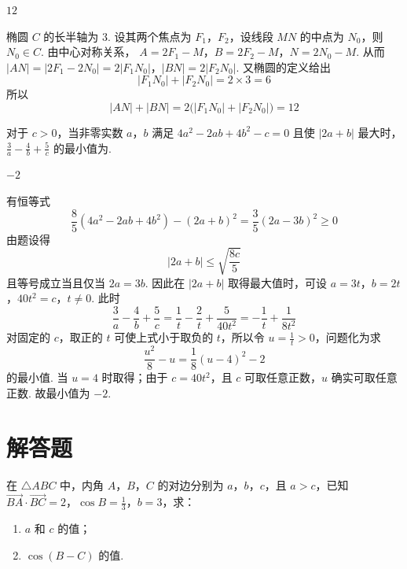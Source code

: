 \begin{answer}
\(12\)
\end{answer}

\begin{solution}
椭圆 \(C\) 的长半轴为 \(3\). 设其两个焦点为 \(F_1\)，\(F_2\)，设线段 \(MN\) 的中点为 \(N_0\)，则 \(N_0\in C\). 由中心对称关系，
\(A=2F_1-M\)，\(B=2F_2-M\)，\(N=2N_0-M\).
从而
\(|AN|=|2F_1-2N_0|=2|F_1N_0|\)，\(|BN|=2|F_2N_0|\).
又椭圆的定义给出
\[
|F_1N_0|+|F_2N_0|=2\times3=6
\]
所以
\[
|AN|+|BN|=2\bigl(|F_1N_0|+|F_2N_0|\bigr)=12
\]
\end{solution}

\begin{problem}
对于 \(c > 0\)，当非零实数 \(a\)，\(b\) 满足 \(4a^2 - 2ab + 4b^2 - c = 0\) 且使 \(|2a + b|\) 最大时，\(\frac{3}{a} - \frac{4}{b} + \frac{5}{c}\) 的最小值为\fillinblank{}.
\end{problem}

\begin{answer}
\(-2\)
\end{answer}

\begin{solution}
有恒等式
\[
\frac85\left(4a^2-2ab+4b^2\right)-(2a+b)^2=\frac35(2a-3b)^2\geqslant0
\]
由题设得
\[
|2a+b|\leqslant\sqrt{\frac{8c}{5}}
\]
且等号成立当且仅当 \(2a=3b\). 因此在 \(|2a+b|\) 取得最大值时，可设
\(a=3t\)，\(b=2t\)，\(40t^2=c\)，\(t\neq0\).
此时
\[
\frac3a-\frac4b+\frac5c=\frac1t-\frac2t+\frac5{40t^2}=-\frac1t+\frac1{8t^2}
\]
对固定的 \(c\)，取正的 \(t\) 可使上式小于取负的 \(t\)，所以令 \(u=\frac1t>0\)，问题化为求
\[
\frac{u^2}{8}-u=\frac18(u-4)^2-2
\]
的最小值. 当 \(u=4\) 时取得；由于 \(c=40t^2\)，且 \(c\) 可取任意正数，\(u\) 确实可取任意正数. 故最小值为 \(-2\).
\end{solution}

\section{解答题}

\begin{problem}
在 \(\triangle ABC\) 中，内角 \(A\)，\(B\)，\(C\) 的对边分别为 \(a\)，\(b\)，\(c\)，且 \(a > c\)，已知 \(\overrightarrow{BA} \cdot \overrightarrow{BC} = 2\)，\(\cos B = \frac{1}{3}\)，\(b = 3\)，求：

\begin{enumerate}
\item \(a\) 和 \(c\) 的值；
\item \(\cos (B - C)\) 的值.
\end{enumerate}
\end{problem}

